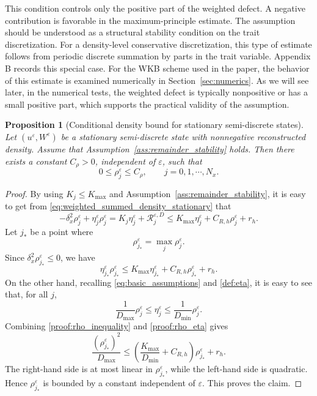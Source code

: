 \documentclass[11pt]{article}
\numberwithin{equation}{section}
\newtheorem{proposition}{Proposition}[section]
\begin{document}
This condition controls only the positive part of the weighted defect.  A
negative contribution is favorable in the maximum-principle estimate. 
 The assumption should be understood as a structural stability condition on the trait
discretization. 
For a density-level conservative discretization, this type of estimate follows
from periodic discrete summation by parts in the trait variable. Appendix B
records this special case.
For the WKB scheme used in the paper,  the behavior of this estimate is examined numerically in
Section~\ref{sec:numerics}.  
As we will see later, in the numerical tests, the weighted defect is
typically nonpositive or has a small positive part, which supports the practical
validity of the assumption.



\begin{proposition}[Conditional density bound for stationary semi-discrete states]
\label{prop:uniform_bound_stationary_mass}
Let \((u^\varepsilon,W^\varepsilon)\) be a stationary semi-discrete state with
nonnegative reconstructed density.  Assume that
Assumption~\ref{ass:remainder_stability} holds.  Then there exists a constant
\(C_\rho>0\), independent of \(\varepsilon\), such that
\[
    0\le \rho_j^\varepsilon\le C_\rho,
    \qquad j=0, 1,\cdots, N_x .
\]
\end{proposition}

\begin{proof}
By using  \(K_j\le K_{\max}\) and Assumption~\ref{ass:remainder_stability}, it is easy to get from \eqref{eq:weighted_summed_density_stationary} that 
\[
    -\delta_x^2\rho_j^\varepsilon
    +
    \eta_j^\varepsilon\rho_j^\varepsilon
    =
    K_j  \eta_j^\varepsilon
    +
    \mathcal R_j^{\varepsilon,D}
    \le
    K_{\max}\eta_j^\varepsilon
    +
    C_{R,h}\rho_j^\varepsilon
    +
    r_h .
\] 
Let \(j_*\) be a point where
\[
    \rho_{j_*}^\varepsilon = \max_j \rho_j^\varepsilon.
\]
Since \(\delta_x^2\rho_{j_*}^\varepsilon\le0\), we have
\begin{equation}\label{proof:rho_inequality}
    \eta_{j_*}^\varepsilon \rho_{j_*}^\varepsilon
    \le
    K_{\max}\eta_{j_*}^\varepsilon
    +
    C_{R,h}\rho_{j_*}^\varepsilon
    +
    r_h .
\end{equation}
On the other hand, recalling \eqref{eq:basic_assumptions} and \eqref{def:eta}, it is easy to see that, for all $j$, 
\begin{equation}\label{proof:rho_eta}
    \frac1{D_{\max}}\rho_j^\varepsilon
    \le
    \eta_j^\varepsilon
    \le
    \frac1{D_{\min}}\rho_j^\varepsilon .
\end{equation}
Combining \eqref{proof:rho_inequality} and \eqref{proof:rho_eta} gives
\[
    \frac{(\rho_{j_*}^\varepsilon)^2}{D_{\max}}
    \le
    \left(
        \frac{K_{\max}}{D_{\min}}+C_{R,h}
    \right)\rho_{j_*}^\varepsilon
    +
    r_h .
\]
The right-hand side is at most linear in \(\rho_{j_*}^\varepsilon\), while the left-hand
side is quadratic.  Hence \(\rho_{j_*}^\varepsilon\) is bounded by a constant independent
of \(\varepsilon\).  This proves the claim.
\end{proof}
\end{document}
